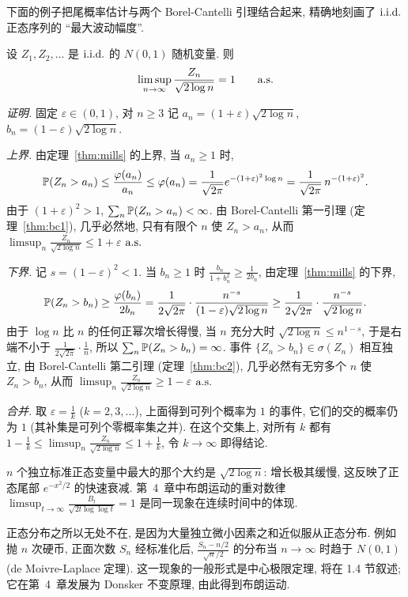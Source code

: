 下面的例子把尾概率估计与两个 Borel-Cantelli 引理结合起来, 精确地刻画了 $\iid$ 正态序列的 ``最大波动幅度''.

\begin{example}[正态序列的增长速度]\label{ex:normal-max}
设 $Z_1,Z_2,\dots$ 是 $\iid$ 的 $N(0,1)$ 随机变量. 则
\[
\limsup_{n\to\infty}\frac{Z_n}{\sqrt{2\log n}}=1\qquad\as
\]

\emph{证明.} 固定 $\varepsilon\in(0,1)$, 对 $n\ge3$ 记 $a_n=(1+\varepsilon)\sqrt{2\log n}$, $b_n=(1-\varepsilon)\sqrt{2\log n}$.

\emph{上界.} 由定理~\ref{thm:mills} 的上界, 当 $a_n\ge1$ 时,
\[
\P(Z_n>a_n)\le\frac{\varphi(a_n)}{a_n}\le\varphi(a_n)=\frac{1}{\sqrt{2\pi}}e^{-(1+\varepsilon)^2\log n}=\frac{1}{\sqrt{2\pi}}\,n^{-(1+\varepsilon)^2}.
\]
由于 $(1+\varepsilon)^2>1$, $\sum_n\P(Z_n>a_n)<\infty$. 由 Borel-Cantelli 第一引理 (定理~\ref{thm:bc1}), 几乎必然地, 只有有限个 $n$ 使 $Z_n>a_n$, 从而 $\limsup_n\frac{Z_n}{\sqrt{2\log n}}\le1+\varepsilon$ $\as$

\emph{下界.} 记 $s=(1-\varepsilon)^2<1$. 当 $b_n\ge1$ 时 $\frac{b_n}{1+b_n^2}\ge\frac{1}{2b_n}$, 由定理~\ref{thm:mills} 的下界,
\[
\P(Z_n>b_n)\ge\frac{\varphi(b_n)}{2b_n}=\frac{1}{2\sqrt{2\pi}}\cdot\frac{n^{-s}}{(1-\varepsilon)\sqrt{2\log n}}\ge\frac{1}{2\sqrt{2\pi}}\cdot\frac{n^{-s}}{\sqrt{2\log n}}.
\]
由于 $\log n$ 比 $n$ 的任何正幂次增长得慢, 当 $n$ 充分大时 $\sqrt{2\log n}\le n^{1-s}$, 于是右端不小于 $\frac{1}{2\sqrt{2\pi}}\cdot\frac{1}{n}$, 所以 $\sum_n\P(Z_n>b_n)=\infty$. 事件 $\{Z_n>b_n\}\in\sigma(Z_n)$ 相互独立, 由 Borel-Cantelli 第二引理 (定理~\ref{thm:bc2}), 几乎必然有无穷多个 $n$ 使 $Z_n>b_n$, 从而 $\limsup_n\frac{Z_n}{\sqrt{2\log n}}\ge1-\varepsilon$ $\as$

\emph{合并.} 取 $\varepsilon=\frac{1}{k}$ ($k=2,3,\dots$), 上面得到可列个概率为 $1$ 的事件, 它们的交的概率仍为 $1$ (其补集是可列个零概率集之并). 在这个交集上, 对所有 $k$ 都有 $1-\frac{1}{k}\le\limsup_n\frac{Z_n}{\sqrt{2\log n}}\le1+\frac{1}{k}$, 令 $k\to\infty$ 即得结论.
\end{example}

\begin{intuition}
$n$ 个独立标准正态变量中最大的那个大约是 $\sqrt{2\log n}$: 增长极其缓慢, 这反映了正态尾部 $e^{-x^2/2}$ 的快速衰减. 第~4~章中布朗运动的重对数律 $\limsup_{t\to\infty}\frac{B_t}{\sqrt{2t\log\log t}}=1$ 是同一现象在连续时间中的体现.
\end{intuition}

\begin{remark}[中心极限定理的背景]
正态分布之所以无处不在, 是因为大量独立微小因素之和近似服从正态分布. 例如抛 $n$ 次硬币, 正面次数 $S_n$ 经标准化后, $\frac{S_n-n/2}{\sqrt{n}/2}$ 的分布当 $n\to\infty$ 时趋于 $N(0,1)$ (de Moivre-Laplace 定理). 这一现象的一般形式是中心极限定理, 将在 1.4 节叙述; 它在第~4~章发展为 Donsker 不变原理, 由此得到布朗运动.
\end{remark}

